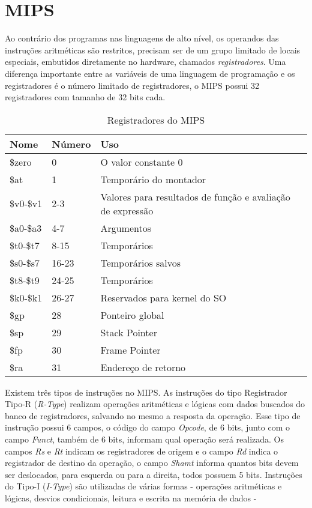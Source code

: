 \section{MIPS} \label{sec_mips}
Ao contrário dos programas nas linguagens de alto nível, os operandos das instruções aritméticas são restritos, precisam ser de um grupo limitado de locais especiais, embutidos diretamente no hardware, chamados \textit{registradores}. Uma diferença importante entre as variáveis de uma linguagem de programação e os registradores é o número limitado de registradores, o MIPS possui 32 registradores com tamanho de 32 bits cada\cite{patterson1}.

\begin{table}[h]
\caption {Registradores do MIPS}
\begin{center}
\begin{tabularx}{8.3cm}{llX} 
\textbf{Nome} & \textbf{Número} & \textbf{Uso} \\ \hline
\$zero & 0 & O valor constante 0 \\ \hline
\$at & 1 & Temporário do montador\\ \hline
\$v0-\$v1 & 2-3 & Valores para resultados de função e avaliação de expressão\\ \hline
\$a0-\$a3 & 4-7 & Argumentos \\ \hline
\$t0-\$t7 & 8-15 & Temporários \\ \hline
\$s0-\$s7 & 16-23 & Temporários salvos \\ \hline
\$t8-\$t9 & 24-25 & Temporários \\ \hline
\$k0-\$k1 & 26-27 & Reservados para kernel do SO \\ \hline
\$gp & 28 & Ponteiro global \\ \hline
\$sp & 29 & Stack Pointer \\ \hline
\$fp & 30 & Frame Pointer \\ \hline
\$ra & 31 & Endereço de retorno \\ \hline
\end{tabularx}
\end{center}
\label{tab:tabela-mips-001}
\end{table}

Existem três tipos de instruções no MIPS. As instruções do tipo Registrador Tipo-R (\textit{R-Type}) realizam operações aritméticas e lógicas com dados buscados do banco de registradores, salvando no mesmo a resposta da operação. Esse tipo de instrução possui 6 campos, o código do campo \textit{Opcode}, de 6 bits, junto com o campo \textit{Funct}, também de 6 bits, informam qual operação será realizada. Os campos \textit{Rs} e \textit{Rt} indicam os registradores de origem e o campo \textit{Rd} indica o registrador de destino da operação, o campo \textit{Shamt} informa quantos bits devem ser deslocados, para esquerda ou para a direita, todos possuem 5 bits. Instruções do Tipo-I (\textit{I-Type}) são utilizadas de várias formas - operações aritméticas e lógicas, desvios condicionais, leitura e escrita na memória de dados - 
